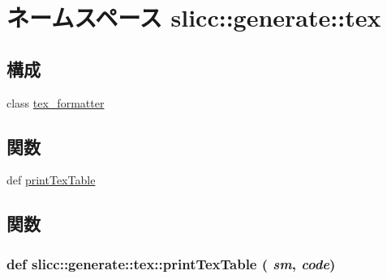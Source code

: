 \hypertarget{namespaceslicc_1_1generate_1_1tex}{
\section{ネームスペース slicc::generate::tex}
\label{namespaceslicc_1_1generate_1_1tex}
}
\subsection*{構成}
\begin{DoxyCompactItemize}
\item 
class \hyperlink{classslicc_1_1generate_1_1tex_1_1tex__formatter}{tex\_\-formatter}
\end{DoxyCompactItemize}
\subsection*{関数}
\begin{DoxyCompactItemize}
\item 
def \hyperlink{namespaceslicc_1_1generate_1_1tex_a792a4db29fef0d611deca70a36af9b3f}{printTexTable}
\end{DoxyCompactItemize}


\subsection{関数}
\hypertarget{namespaceslicc_1_1generate_1_1tex_a792a4db29fef0d611deca70a36af9b3f}{
\subsubsection[{printTexTable}]{\setlength{\rightskip}{0pt plus 5cm}def slicc::generate::tex::printTexTable ( {\em sm}, \/   {\em code})}}
\label{namespaceslicc_1_1generate_1_1tex_a792a4db29fef0d611deca70a36af9b3f}



